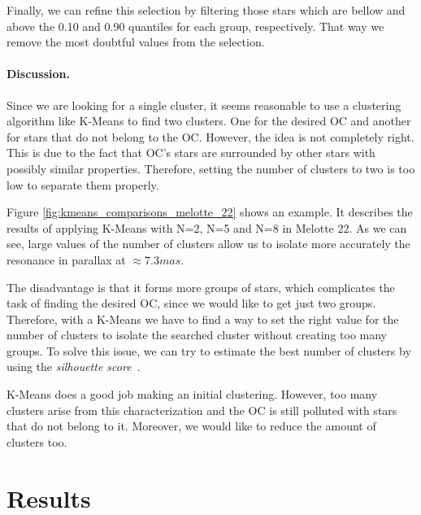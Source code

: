 \documentclass[11pt,a4paper,english,twocolumn]{article}
\begin{document}
Finally, we can refine this selection by filtering those stars which are bellow and above
the 0.10 and 0.90 quantiles for each group, respectively. That way we remove the most
doubtful values from the selection.

\paragraph{Discussion.}

Since we are looking for a single cluster, it seems reasonable to use a clustering algorithm
like K-Means to find two clusters. One for the desired OC and another for stars that do not
belong to the OC. However, the idea is not completely right. This is due to the fact that OC's
stars are surrounded by other stars with possibly similar properties. Therefore, setting the
number of clusters to two is too low to separate them properly.

Figure \ref{fig:kmeans_comparisons_melotte_22} shows an example. It describes the results of
applying K-Means with N=2, N=5 and N=8 in Melotte 22. As we can see, large values of the number
of clusters allow us to isolate more accurately the resonance in parallax at \(\approx 7.3mas\).

The disadvantage is that it forms more groups of stars, which complicates the task of finding the
desired OC, since we would like to get just two groups. Therefore, with a K-Means we have to find
a way to set the right value for the number of clusters to isolate the searched cluster without
creating too many groups. To solve this issue, we can try to estimate the best number of clusters
by using the \emph{silhouette score}~\cite{rousseeuw1987silhouettes}.

K-Means does a good job making an initial clustering. However, too many clusters arise
from this characterization and the OC is still polluted with stars that do not belong to it.
Moreover, we would like to reduce the amount of clusters too.

\section{Results}
\label{sec:results}
\end{document}
